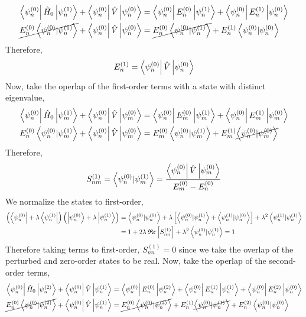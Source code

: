 \documentclass[12pt]{extarticle}
\begin{document}
\begin{align*}
\left< \psi^{(0)}_n \right| \hat{H}_0 \left| \psi^{(1)}_n \right> + \left< \psi^{(0)}_n \right| \hat{V} \left| \psi^{(0)}_n \right> &= \left< \psi^{(0)}_n \right| E^{(0)}_n \left| \psi^{(1)}_n \right> + \left< \psi^{(0)}_n \right| E^{(1)}_n \left| \psi^{(0)}_n \right> \\
\cancel{E^{(0)}_n \left< \psi^{(0)}_n | \psi^{(1)}_n \right>} + \left< \psi^{(0)}_n \right| \hat{V} \left| \psi^{(0)}_n \right> &= \cancel{E^{(0)}_n  \left< \psi^{(0)}_n | \psi^{(1)}_n \right>} + E^{(1)}_n \left< \psi^{(0)}_n | \psi^{(0)}_n \right> 
\end{align*}
Therefore,
\[E_n^{(1)} = \left< \psi^{(0)}_n \right| \hat{V} \left| \psi^{(0)}_n \right>\]
Now, take the operlap of the first-order terms with a state with distinct eigenvalue, 
\begin{align*}
\left< \psi^{(0)}_n \right| \hat{H}_0 \left| \psi^{(1)}_m \right> + \left< \psi^{(0)}_n \right| \hat{V} \left| \psi^{(0)}_m \right> &= \left< \psi^{(0)}_n \right| E^{(0)}_m \left| \psi^{(1)}_m \right> + \left< \psi^{(0)}_n \right| E^{(1)}_m \left| \psi^{(0)}_m \right> \\
E^{(0)}_n \left< \psi^{(0)}_n | \psi^{(1)}_m \right> + \left< \psi^{(0)}_n \right| \hat{V} \left| \psi^{(0)}_m \right> &= E^{(0)}_m  \left< \psi^{(0)}_n | \psi^{(1)}_m \right> + E^{(1)}_m \cancel{\left< \psi^{(0)}_n | \psi^{(0)}_m \right>} 
\end{align*}
Therefore,
\[ S^{(1)}_{nm} = \left< \psi^{(0)}_n | \psi^{(1)}_m \right> = \frac{\left< \psi^{(0)}_n \right| \hat{V} \left| \psi^{(0)}_m \right>}{E^{(0)}_m - E^{(0)}_n}\]
We normalize the states to first-order, 
\begin{align*}
\left(\left< \psi^{(0)}_n \right| + \lambda \left< \psi^{(1)}_n \right| \right) \left( \left| \psi^{(0)}_n \right> + \lambda \left| \psi^{(1)}_n \right> \right) & = \left< \psi^{(0)}_n | \psi^{(0)}_n \right> + \lambda \left[\left< \psi^{(0)}_n | \psi^{(1)}_n \right> + \left< \psi^{(1)}_n | \psi^{(0)}_n \right> \right] + \lambda^2 \left< \psi^{(1)}_n | \psi^{(1)}_n \right> \\
& = 1 + 2\lambda \: \mathfrak{Re}\left[ S_{nn}^{(1)} \right] + \lambda^2 \left< \psi^{(1)}_n | \psi^{(1)}_n \right> = 1
\end{align*}
Therefore taking terms to first-order, $S_{nn}^{(1)} = 0$ since we take the overlap of the perturbed and zero-order states to be real. Now, take the operlap of the second-order terms,
\begin{align*}
\left< \psi^{(0)}_n \right| \hat{H}_0 \left| \psi^{(2)}_n \right> + \left< \psi^{(0)}_n \right| \hat{V} \left| \psi^{(1)}_n \right> &= \left< \psi^{(0)}_n \right| E^{(0)}_n \left| \psi^{(2)}_n \right> + \left< \psi^{(0)}_n \right| E^{(1)}_n \left| \psi^{(1)}_n \right> + \left< \psi^{(0)}_n \right| E^{(2)}_n \left| \psi^{(0)}_n \right> \\
\cancel{E^{(0)}_n \left< \psi^{(0)}_n | \psi^{(2)}_n \right>} + \left< \psi^{(0)}_n \right| \hat{V} \left| \psi^{(1)}_n \right> &= \cancel{E^{(0)}_n \left< \psi^{(0)}_n | \psi^{(2)}_n \right>} + E^{(1)}_n \cancel{\left< \psi^{(0)}_n | \psi^{(1)}_n \right>} + E^{(2)}_n \left< \psi^{(0)}_n | \psi^{(0)}_n \right> 
\end{align*}
\end{document}
